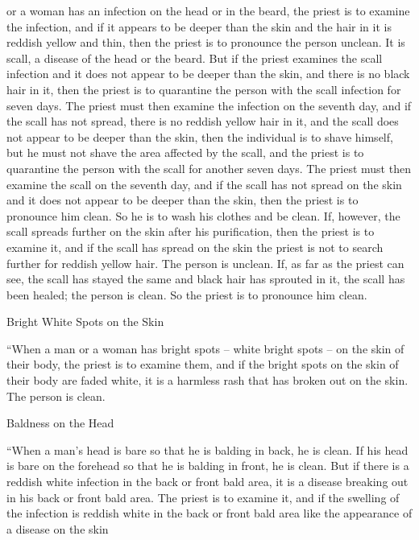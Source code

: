 {or
a woman
has an infection
on the head
or
in the beard,
the
priest
is to examine
the infection,
and if it appears
to be deeper
than
the skin
and the hair
in it is reddish yellow
and thin,
then the priest
is to pronounce the person unclean.
It is
scall,
a disease
of the head
or
the beard.
But
if
the priest
examines
the scall
infection
and it does not
appear
to be deeper
than
the skin,
and there is no
black
hair
in it, then
the priest
is to quarantine
the person with the scall
infection
for seven
days.
The priest
must then examine
the infection
on
the seventh
day,
and if the scall
has not
spread,
there is no
reddish yellow
hair
in it,
and the scall
does not
appear to be deeper
than
the skin,
then the
individual is to shave
himself, but he must not
shave
the
area affected by the scall,
and the priest
is to quarantine
the person with the scall
for another
seven
days.
The priest
must then examine
the scall
on
the seventh
day,
and if the scall
has not
spread
on the skin
and it does not
appear
to be deeper
than
the skin,
then the
priest
is to pronounce him clean.
So he is to wash
his clothes
and be clean.
If,
however,
the scall
spreads
further
on the skin
after
his purification,
then
the priest
is
to examine
it, and if the scall
has spread
on the skin
the priest
is not
to search
further for reddish yellow
hair.
The person is unclean.
If,
as far as the priest can see,
the scall
has stayed
the same and black
hair
has sprouted
in it, the scall
has been healed;
the person is clean.
So the priest
is to pronounce him clean.
\par }{\SH Bright White Spots on the Skin
\par }{\PP {}“When a man
or
a woman
has
bright spots
– white
bright spots
– on the skin
of their body,
the priest
is
to examine
them, and if the bright spots
on the skin
of their body
are faded
white,
it is a harmless
rash that has broken out
on the skin.
The person is clean.
\par }{\SH Baldness on the Head
\par }{\PP {}“When
a man’s
head
is bare so that
he is balding
in back, he is clean.
If
his head
is bare on the forehead so that he is balding
in front,
he is
clean.
But if
there
is a reddish
white
infection
in the back
or
front bald
area, it is a disease
breaking
out in his back
or
front bald area.
The
priest
is to examine
it, and if the swelling
of the infection
is reddish
white
in the back
or
front bald
area like the appearance
of a disease
on the skin
}
